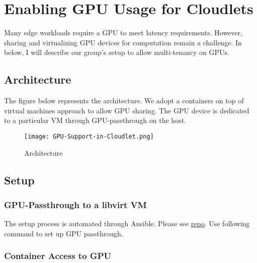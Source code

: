 \section{Enabling GPU Usage for Cloudlets}
\label{enable-gpu-for-cloudlets}

Many edge workloads require a GPU to meet latency requirements. However,
sharing and virtualizing GPU devices for computation remain a challenge.
In below, I will describe our group's setup to allow multi-tenancy on
GPUs.

\subsection{Architecture}\label{architecture}

The figure below represents the architecture. We adopt a containers on
top of virtual machines approach to allow GPU sharing. The GPU device is
dedicated to a particular VM through GPU-passthrough on the host.

\begin{figure}[htbp]
\centering
\texttt{[image: GPU-Support-in-Cloudlet.png]}
\caption{Architecture}
\end{figure}

\subsection{Setup}\label{setup}

\subsubsection{GPU-Passthrough to a libvirt
VM}\label{gpu-passthrough-to-a-libvirt-vm}

The setup process is automated through Ansible. Please see
\href{https://github.com/junjuew/ansible-dotfiles/}{repo}. Use following
command to set up GPU passthrough.

\begin{Shaded}
\begin{Highlighting}[]
 
\end{Highlighting}
\end{Shaded}

\subsubsection{Container Access to GPU}\label{container-access-to-gpu}

